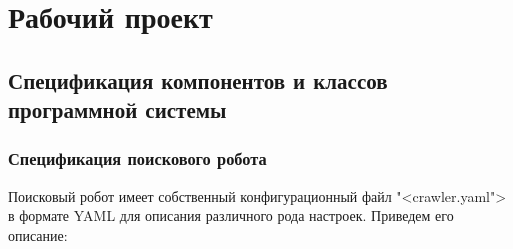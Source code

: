 \section{Рабочий проект}

\subsection{Спецификация компонентов и классов программной системы}

\subsubsection{Спецификация поискового робота}

Поисковый робот имеет собственный конфигурационный файл "<crawler.yaml"> в формате YAML для описания различного рода настроек. Приведем его описание:
